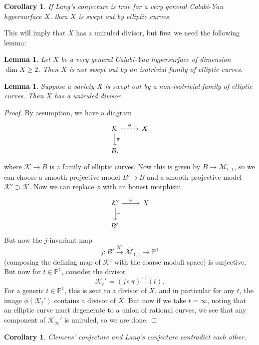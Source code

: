 \documentclass{amsart}
\newtheorem{cor}[thm]{Corollary}
\newtheorem{lem}[thm]{Lemma}
\theoremstyle{definition}
\theoremstyle{remark}
\theoremstyle{plain}
\theoremstyle{definition}
\theoremstyle{remark}
\renewcommand{\P}{\mathbb{P}}
\newcommand{\mc}[1]{\mathcal{#1}}
\newcommand{\ol}[1]{\overline{#1}}
\newcommand{\1}{\mathbf{1}}
\newcommand{\2}{\mathbf{2}}
\newcommand{\3}{\mathbf{3}}
\begin{document}
\begin{cor}
    If Lang's conjecture is true for a very general Calabi-Yau hypersurface $X$, then $X$ is swept out by elliptic curves.
\end{cor}

This will imply that $X$ has a uniruled divisor, but first we need the following lemma:

\begin{lem}
    Let $X$ be a very general Calabi-Yau hypersurface of dimension $\dim X \geq 2$. Then $X$ is not swept out by an isotrivial family of elliptic curves.
\end{lem}

\begin{lem}
    Suppose a variety $X$ is swept out by a non-isotrivial family of elliptic curves. Then $X$ has a uniruled divisor.
\end{lem}

\begin{proof}
    By assumption, we have a diagram
    \begin{equation*}
    \begin{tikzcd}
        \mc{K} \ar[dashrightarrow]{r}{\phi} \ar{d}{\pi} & X \\
        B,
    \end{tikzcd}
    \end{equation*}
    where $\mc{K} \to B$ is a family of elliptic curves. Now this is given by $B \to \mc{M}_{1,1}$, so we can choose a smooth projective model $B' \supset B$ and a smooth projective model $\mc{K}' \supset \mc{K}$. Now we can replace $\phi$ with an honest morphism
    \begin{equation*}
    \begin{tikzcd}
        \mc{K}' \ar{r}{\phi} \ar{d}{\pi} & X \\
        B'.
    \end{tikzcd}
    \end{equation*}
    But now the $j$-invariant map
    \[ j \colon B' \xrightarrow{\mc{K}'} \ol{\mc{M}}_{1,1} \to \P^1 \]
    (composing the defining map of $\mc{K}'$ with the coarse moduli space) is surjective. But now for $t \in \P^1$, consider the divisor
    \[ \mc{K}_t' \coloneqq (j \circ \pi)^{-1}(t). \]
    For a generic $t \in \P^1$, this is sent to a divisor of $X$, and in particular for any $t$, the image $\phi(\mc{K}_t')$ contains a divisor of $X$. But now if we take $t = \infty$, noting that an elliptic curve must degenerate to a union of rational curves, we see that any component of $\mc{K}_{\infty}'$ is uniruled, so we are done.
\end{proof}

\begin{cor}
    Clemens' conjecture and Lang's conjecture contradict each other.
\end{cor}
\end{document}

